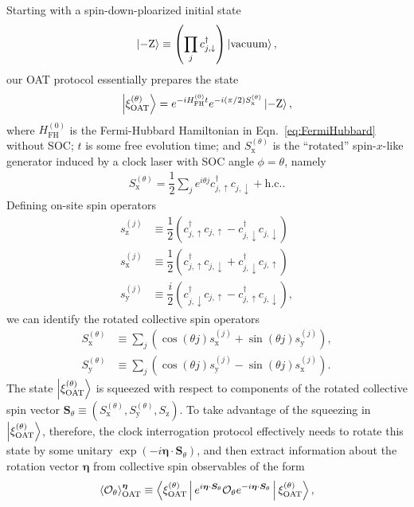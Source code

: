 \documentclass[aps,prx,superscriptaddress,twocolumn]{revtex4-2}
\renewcommand{\t}{\text} %
\newcommand{\f}[2]{\dfrac{#1}{#2}} %
\newcommand{\p}[1]{\left(#1\right)} %
\renewcommand{\c}{\cdot} %
\renewcommand{\v}{\bm} %
\newcommand{\bk}{\Braket}
\renewcommand{\ket}{\Ket}
\renewcommand{\O}{\mathcal{O}}
\newcommand{\z}{\text{z}}
\newcommand{\x}{\text{x}}
\newcommand{\y}{\text{y}}
\newcommand{\up}{\uparrow}
\newcommand{\dn}{\downarrow}
\begin{document}
Starting with a spin-down-ploarized initial state
\begin{align}
  \ket{-\t{Z}}\equiv\p{\prod_j c_{j,\dn}^\dag}\ket{\t{vacuum}},
\end{align}
our OAT protocol essentially prepares the state
\begin{align}
  \ket{\xi_{\t{OAT}}^{(\theta)}} = e^{-i H_{\t{FH}}^{(0)}t}
  e^{-i\p{\pi/2}S_\x^{(\theta)}} \ket{-\t{Z}},
\end{align}
where $H_{\t{FH}}^{(0)}$ is the Fermi-Hubbard Hamiltonian in Eqn.~\eqref{eq:FermiHubbard} without SOC; $t$ is some free evolution time; and $S_\x^{(\theta)}$ is the ``rotated'' spin-$x$-like generator induced by a clock laser with SOC angle $\phi=\theta$, namely
\begin{align}
  S_\x^{(\theta)}
  = \f12 \sum_j e^{i\theta j} c_{j,\up}^\dag c_{j,\dn} + \t{h.c.}.
\end{align}
Defining on-site spin operators
\begin{align}
  s_\z^{(j)} &\equiv \f12 \p{ c_{j,\up}^\dag c_{j,\up}
    - c_{j,\dn}^\dag c_{j,\dn}} \\
  s_\x^{(j)} &\equiv \f12 \p{c_{j,\up}^\dag c_{j,\dn}
    + c_{j,\dn}^\dag c_{j,\up}} \\
  s_\y^{(j)} &\equiv \f{i}{2} \p{c_{j,\dn}^\dag c_{j,\up}
    - c_{j,\up}^\dag c_{j,\dn}},
\end{align}
we can identify the rotated collective spin operators
\begin{align}
  S_\x^{(\theta)} &\equiv \sum_j \p{\cos\p{\theta j} s_\x^{(j)}
  + \sin\p{\theta j} s_\y^{(j)}},
  \label{eq:S_x_theta} \\
  S_\y^{(\theta)} &\equiv \sum_j \p{\cos\p{\theta j} s_\y^{(j)}
  - \sin\p{\theta j} s_\x^{(j)}}.
  \label{eq:S_y_theta}
\end{align}
The state $\ket{\xi_{\t{OAT}}^{(\theta)}}$ is squeezed with respect to components of the rotated collective spin vector $\v S_\theta \equiv \p{S_\x^{(\theta)},S_\y^{(\theta)},S_\z}$.
To take advantage of the squeezing in $\ket{\xi_{\t{OAT}}^{(\theta)}}$, therefore, the clock interrogation protocol effectively needs to rotate this state by some unitary $\exp\p{-i\v\eta\c\v S_\theta}$, and then extract information about the rotation vector $\v\eta$ from collective spin observables of the form
\begin{align}
  \bk{\O_\theta}_{\t{OAT}}^{\v\eta}
  \equiv \bk{\xi_{\t{OAT}}^{(\theta)}| e^{i\v\eta\c\v S_\theta}
    \O_\theta e^{-i\v\eta\c\v S_\theta} |\xi_{\t{OAT}}^{(\theta)}},
\end{align}
\end{document}
